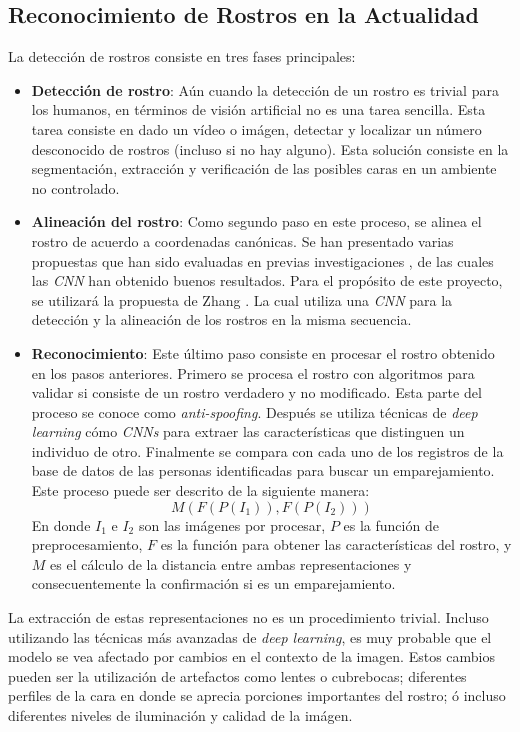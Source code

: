 \documentclass[letterpaper, 10 pt, conference]{ieeeconf}  %
\begin{document}
    \subsection{Reconocimiento de Rostros en la Actualidad}
    La detección de rostros consiste en tres fases principales:
    \begin{itemize}
        \item \textbf{Detección de rostro}: Aún cuando la detección de un rostro es trivial
            para los humanos, en términos de visión artificial no es una tarea sencilla. Esta
            tarea consiste en dado un vídeo o imágen, detectar y localizar un número
            desconocido de rostros (incluso si no hay alguno). Esta solución consiste en la
            segmentación, extracción y verificación de las posibles caras en un ambiente
            no controlado. \cite{FaceDetection2001}

        \item \textbf{Alineación del rostro}: Como segundo paso en este proceso, se alinea
            el rostro de acuerdo a coordenadas canónicas.\cite{Wang2021} Se han presentado
            varias propuestas que han sido evaluadas en previas investigaciones
            \cite{Zafeiriou2015}, de las cuales las \textit{CNN} han obtenido buenos resultados.
            Para el propósito de este proyecto, se utilizará la propuesta de Zhang \cite{MTCNN}.
            La cual utiliza una \textit{CNN} para la detección y la alineación de los rostros
            en la misma secuencia.

        \item \textbf{Reconocimiento}: Este último paso consiste en procesar el rostro obtenido
            en los pasos anteriores. Primero se procesa el rostro con algoritmos para validar
            si consiste de un rostro verdadero y no modificado. Esta parte del proceso se conoce
            como \textit{anti-spoofing}. Después se utiliza técnicas de \textit{deep learning} cómo
            \textit{CNNs} para extraer las características que distinguen un individuo de otro.
            Finalmente se compara con cada uno de los registros de la base de datos de las
            personas identificadas para buscar un emparejamiento.
            Este proceso puede ser descrito de la siguiente manera: \cite{Wang2021}
                \[ M(F(P(I_1)), F(P(I_2))) \]
            En donde \textit{$I_1$} e \textit{$I_2$} son las imágenes por procesar, \textit{$P$}
            es la función de preprocesamiento, \textit{$F$} es la función para obtener las
            características del rostro, y \textit{$M$} es el cálculo de la distancia entre
            ambas representaciones y consecuentemente la confirmación si es un emparejamiento.
    \end{itemize}
    La extracción de estas representaciones no es un procedimiento trivial. Incluso utilizando
    las técnicas más avanzadas de \textit{deep learning}, es muy probable que el modelo se vea
    afectado por cambios en el contexto de la imagen. Estos cambios pueden ser la utilización
    de artefactos como lentes o cubrebocas; diferentes perfiles de la cara en donde se aprecia
    porciones importantes del rostro; ó incluso diferentes niveles de iluminación y calidad de la
    imágen. \cite{Bodini2019}
\end{document}
